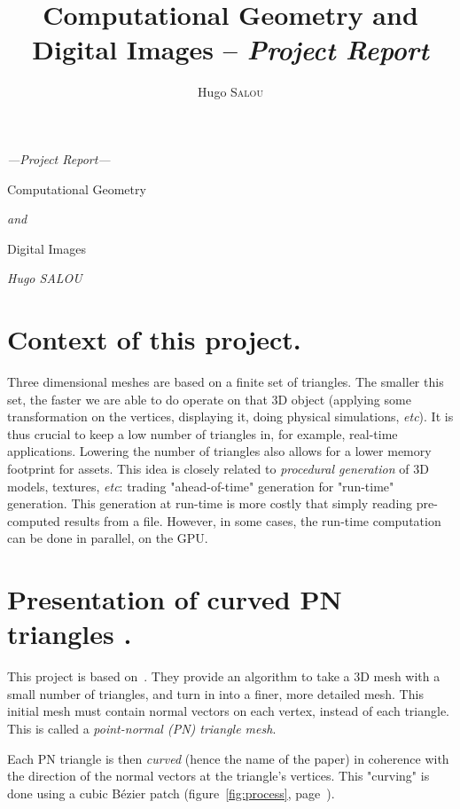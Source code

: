\documentclass[fontsize=13pt,a4paper,DIV=15,parskip=half]{scrartcl}
\title{Computational Geometry and Digital Images -- \textit{Project Report}}
\author{Hugo \textsc{Salou}}
\theoremstyle{definition}
\begin{document}
  \begin{center}
    \bfseries
    \sffamily

    {\large\itshape ---\hspace{1em}Project Report\hspace{1em}---}

    {\huge Computational Geometry}

    \vspace{-0.75em}

    {\LARGE\textit{and}}

    \vspace{-0.5em}

    {\huge Digital Images}

    {\large \itshape Hugo SALOU}
  \end{center}

  \section{Context of this project.}

  Three dimensional meshes are based on a finite set of triangles. The smaller
  this set, the faster we are able to do operate on that 3D object (applying
  some transformation on the vertices, displaying it, doing physical
  simulations, \textit{etc}). It is thus crucial to keep a low number of
  triangles in, for example, real-time applications. Lowering the number of
  triangles also allows for a lower memory footprint for assets. This idea is
  closely related to \textit{procedural generation} of 3D models, textures,
  \textit{etc}: trading "ahead-of-time" generation for "run-time" generation.
  This generation at run-time is more costly that simply reading pre-computed
  results from a file. However, in some cases, the run-time computation can be
  done in parallel, on the GPU.

  \section{Presentation of curved PN triangles \cite{curvedpntriangles}.}

  This project is based on~\cite{curvedpntriangles}. They provide an algorithm
  to take a 3D mesh with a small number of triangles, and turn in into a finer,
  more detailed mesh. This initial mesh must contain normal vectors on each
  vertex, instead of each triangle. This is called a \textit{point-normal (PN)
  triangle mesh}.

  Each PN triangle is then \textit{curved} (hence the name of the paper) in
  coherence with the direction of the normal vectors at the triangle's
  vertices. This "curving" is done using a cubic Bézier patch
  (figure~\ref{fig:process}, page~\pageref{fig:process}).
\end{document}
